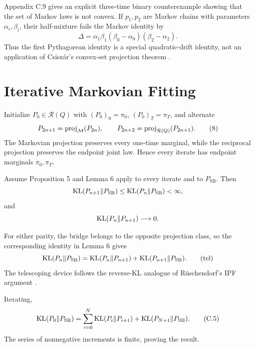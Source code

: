 \begin{remark}
Appendix C.9 gives an explicit three-time binary counterexample showing that the set of Markov laws is not convex.  If \(p_1,p_2\) are Markov chains with parameters \(\alpha_i,\beta_i\), their half-mixture fails the Markov identity by
\[
 \Delta=\alpha_1\beta_1(\beta_0-\alpha_0)(\beta_2-\alpha_2).
\]
Thus the first Pythagorean identity is a special quadratic-drift identity, not an application of Csisz\'ar's convex-set projection theorem \cite{Csiszar1975}.
\end{remark}

\section{Iterative Markovian Fitting}

Initialize \(P_0\in\mathcal R(Q)\) with \((P_0)_0=\pi_0\), \((P_0)_T=\pi_T\), and alternate
\begin{equation}
 P_{2n+1}=\operatorname{proj}_{\mathcal{M}}(P_{2n}),
 \qquad
 P_{2n+2}=\operatorname{proj}_{\mathcal R(Q)}(P_{2n+1}).
 \tag{8}\label{eq:DSBM-IMF}
\end{equation}
The Markovian projection preserves every one-time marginal, while the reciprocal projection preserves the endpoint joint law.  Hence every iterate has endpoint marginals \(\pi_0,\pi_T\).

\begin{proposition}[Proposition 7]
Assume Proposition 5 and Lemma 6 apply to every iterate and to \(P_{\mathrm{SB}}\).  Then
\[
 \mathrm{KL}(P_{n+1}\|P_{\mathrm{SB}})
 \le\mathrm{KL}(P_n\|P_{\mathrm{SB}})<\infty,
\]
and
\[
 \mathrm{KL}(P_n\|P_{n+1})\longrightarrow0.
\]
\end{proposition}

For either parity, the bridge belongs to the opposite projection class, so the corresponding identity in Lemma 6 gives
\begin{equation}
 \mathrm{KL}(P_n\|P_{\mathrm{SB}})
 =\mathrm{KL}(P_n\|P_{n+1})
  +\mathrm{KL}(P_{n+1}\|P_{\mathrm{SB}}).
 \tag{tel}\label{eq:DSBM-telescope-one}
\end{equation}
The telescoping device follows the reverse-KL analogue of R\"uschendorf's IPF argument \cite{Ruschendorf1995}.

Iterating,
\begin{equation}
 \mathrm{KL}(P_0\|P_{\mathrm{SB}})
 =\sum_{i=0}^N\mathrm{KL}(P_i\|P_{i+1})
  +\mathrm{KL}(P_{N+1}\|P_{\mathrm{SB}}).
 \tag{C.5}\label{eq:DSBM-telescope}
\end{equation}
The series of nonnegative increments is finite, proving the result.

